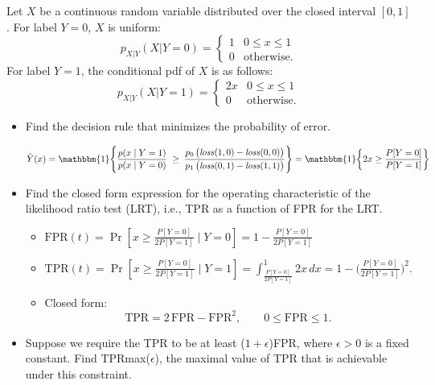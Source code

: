 \documentclass[a4paper]{article}
\begin{document}
\section{}
Let $X$ be a continuous random variable distributed over the closed interval $[0,1]$.
For label $Y = 0$, $X$ is uniform:
$$p_{X|Y}(X | Y = 0) = \left\{\begin{array}{ll} 1 & 0 \leq x \leq 1 \\ 0 & \text{otherwise}.  \end{array}\right.$$
For label $Y = 1$, the conditional pdf of $X$ is as follows:
$$p_{X|Y}(X | Y = 1) = \left\{\begin{array}{ll} 2x & 0 \leq x \leq 1 \\ 0 & \text{otherwise}.  \end{array}\right.$$
    \begin{itemize}
        \item Find the decision rule that minimizes the probability of error.

            $$\hat{Y}(x) = \mathbbm{1}\!\left\{ 
            \frac{p(x \mid Y=1)}{p(x \mid Y=0)} 
            \;\geq\;
            \frac{p_0 \, \big(\mathit{loss}(1,0) - \mathit{loss}(0,0)\big)}{p_1 \, \big(\mathit{loss}(0,1) - \mathit{loss}(1,1)\big)}
            \right\} = \mathbbm{1}\!\left\{ 2x \geq \frac{P[Y=0]}{P[Y=1]} \right\}$$
        \item Find the closed form expression for the operating characteristic of the likelihood ratio test (LRT), i.e., TPR as a function of FPR for the LRT.
            \begin{itemize}
                \item $\mathrm{FPR}(t)=\Pr[x\ge \frac{P[Y=0]}{2P[Y=1]}\mid Y=0]=1-\frac{P[Y=0]}{2P[Y=1]}$
                \item $\mathrm{TPR}(t)=\Pr[x\ge \frac{P[Y=0]}{2P[Y=1]}\mid Y=1]=\int_{\frac{P[Y=0]}{2P[Y=1]}}^1 2x\,dx =1-\Big(\frac{P[Y=0]}{2P[Y=1]}\Big)^2.$
                \item Closed form:
                    $$\boxed{\;\mathrm{TPR}=2\,\mathrm{FPR}-\mathrm{FPR}^2,\qquad 0\le \mathrm{FPR}\le 1.\;}$$
            \end{itemize}

        \item Suppose we require the TPR to be at least ($1+\epsilon$)FPR, where $\epsilon > 0$ is a fixed constant.
        Find TPRmax($\epsilon$), the maximal value of TPR that is achievable under this constraint.


\end{itemize}
\end{document}
